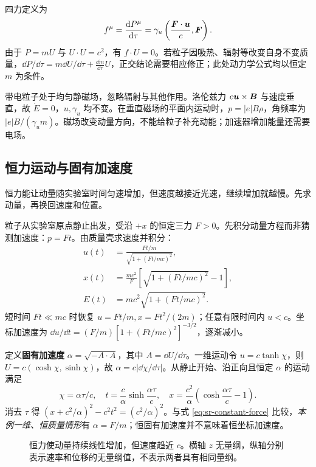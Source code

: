 四力定义为
\[
f^\mu=\frac{\mathrm{d} P^\mu}{\mathrm{d}\tau}
=\gamma_u\left(\frac{\boldsymbol{F}\cdot\boldsymbol{u}}{c},\boldsymbol{F}\right).
\]
由于 $P=mU$ 与 $U\cdot U=c^2$，有 $f\cdot U=0$。若粒子因吸热、辐射等改变自身不变质量，$\dd P/\dd\tau=m\dd U/\dd\tau+\frac{\dd m}{\dd\tau}U$，正交结论需要相应修正；此处动力学公式均以恒定 $m$ 为条件。

\begin{example}[为什么磁场能弯曲轨迹而不做功]
带电粒子处于均匀静磁场，忽略辐射与其他作用。洛伦兹力 $e\boldsymbol{u}\times\boldsymbol{B}$ 与速度垂直，故 $\dot E=0$，$u,\gamma_u$ 均不变。在垂直磁场的平面内运动时，$p=|e|B\rho$，角频率为 $|e|B/(\gamma_um)$。磁场改变动量方向，不能给粒子补充动能；加速器增加能量还需要电场。
\end{example}

\subsection{恒力运动与固有加速度}
恒力能让动量随实验室时间匀速增加，但速度越接近光速，继续增加就越慢。先求动量，再换回速度和位置。

粒子从实验室原点静止出发，受沿 $+x$ 的恒定三力 $F>0$。先积分动量方程而非猜测加速度：$p=Ft$。由质量壳求速度并积分：
\begin{equation}\label{eq:sr-constant-force}
\begin{aligned}
u(t)&=\frac{Ft/m}{\sqrt{1+(Ft/mc)^2}},\\
x(t)&=\frac{mc^2}{F}\left[\sqrt{1+(Ft/mc)^2}-1\right],\\
E(t)&=mc^2\sqrt{1+(Ft/mc)^2}.
\end{aligned}
\end{equation}
短时间 $Ft\ll mc$ 时恢复 $u=Ft/m,x=Ft^2/(2m)$；任意有限时间内 $u<c$。坐标加速度为 $\dd u/\dd t=(F/m)[1+(Ft/mc)^2]^{-3/2}$，逐渐减小。

定义\textbf{固有加速度} $\alpha=\sqrt{-A\cdot A}$，其中 $A=\dd U/\dd\tau$。一维运动令 $u=c\tanh\chi$，则 $U=c(\cosh\chi,\sinh\chi)$，故 $\alpha=c|\dd\chi/\dd\tau|$。从静止开始、沿正向且恒定 $\alpha$ 的运动满足
\[
\chi=\alpha\tau/c,\quad
t=\frac{c}{\alpha}\sinh\frac{\alpha\tau}{c},\quad
x=\frac{c^2}{\alpha}\left(\cosh\frac{\alpha\tau}{c}-1\right).
\]
消去 $\tau$ 得 $(x+c^2/\alpha)^2-c^2t^2=(c^2/\alpha)^2$。与式 \eqref{eq:sr-constant-force} 比较，\emph{本例一维、恒质量情形}有 $\alpha=F/m$；恒固有加速度并不意味着恒坐标加速度。

\begin{figure}[htbp]\centering
{}
\caption{恒力使动量持续线性增加，但速度趋近 $c$。横轴 $z$ 无量纲，纵轴分别表示速率和位移的无量纲值，不表示两者具有相同量纲。}\label{fig:sr-constant-force}
\end{figure}

